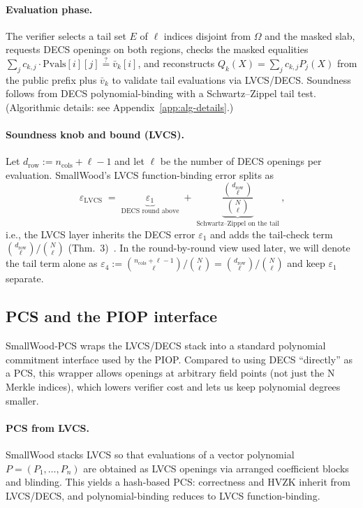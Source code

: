 \paragraph{Evaluation phase.}
The verifier selects a tail set $E$ of $\ell$ indices disjoint from $\Omega$ and the masked slab, requests DECS openings on both regions, checks the masked equalities $\sum_j c_{k,j}\cdot \mathrm{Pvals}[i][j]\stackrel{?}{=}\bar v_k[i]$, and reconstructs $Q_k(X)=\sum_j c_{k,j}P_j(X)$ from the public prefix plus $\bar v_k$ to validate tail evaluations via LVCS/DECS. Soundness follows from DECS polynomial-binding with a Schwartz--Zippel tail test. (Algorithmic details: see Appendix~\ref{app:alg-details}.)

\paragraph{Soundness knob and bound (LVCS).}
Let $d_{\mathrm{row}}:=n_{\mathrm{cols}}+\ell-1$ and let $\ell$ be the number of DECS openings per evaluation. SmallWood’s LVCS function-binding error splits as
\[
\boxed{\ \varepsilon_{\mathrm{LVCS}} \;=\; \underbrace{\varepsilon_1}_{\text{DECS round above}} \;+\; \underbrace{\frac{\binom{d_{\mathrm{row}}}{\ell}}{\binom{N}{\ell}}}_{\text{Schwartz--Zippel on the tail}}\ }\!,
\]
i.e., the LVCS layer inherits the DECS error $\varepsilon_1$ and adds the tail-check term $\binom{d_{\mathrm{row}}}{\ell}/\binom{N}{\ell}$ (Thm.~3)~\cite{cryptoeprint:2025/1085}. In the round-by-round view used later, we will denote the tail term alone as \(\varepsilon_4 := \binom{n_{\mathrm{cols}}+\ell-1}{\ell}\Big/\binom{N}{\ell} = \binom{d_{\mathrm{row}}}{\ell}\Big/\binom{N}{\ell}\) and keep $\varepsilon_1$ separate.


\subsection{PCS and the PIOP interface}
SmallWood‑PCS wraps the LVCS/DECS stack into a standard polynomial commitment interface used by the PIOP. Compared to using DECS “directly” as a PCS, this wrapper allows openings at arbitrary field points (not just the N Merkle indices), which lowers verifier cost and lets us keep polynomial degrees smaller.
\label{subsec:pacs-piop}

\paragraph{PCS from LVCS.}
SmallWood stacks LVCS so that evaluations of a vector polynomial $P=(P_1,\ldots,P_n)$ are obtained as LVCS openings via arranged coefficient blocks and blinding. This yields a hash-based PCS: correctness and HVZK inherit from LVCS/DECS, and polynomial-binding reduces to LVCS function-binding.

